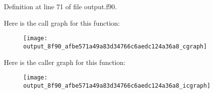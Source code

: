 Definition at line 71 of file output.f90.



Here is the call graph for this function:\nopagebreak
\begin{figure}[H]
\begin{center}
\leavevmode
\texttt{[image: output\_8f90\_afbe571a49a83d34766c6aedc124a36a8\_cgraph]}
\end{center}
\end{figure}




Here is the caller graph for this function:
\nopagebreak
\begin{figure}[H]
\begin{center}
\leavevmode
\texttt{[image: output\_8f90\_afbe571a49a83d34766c6aedc124a36a8\_icgraph]}
\end{center}
\end{figure}


